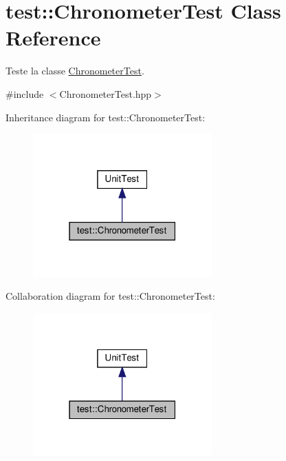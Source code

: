 \hypertarget{classtest_1_1ChronometerTest}{}\section{test\+:\+:Chronometer\+Test Class Reference}
\label{classtest_1_1ChronometerTest}


Teste la classe \hyperlink{classtest_1_1ChronometerTest}{Chronometer\+Test}.  




{\ttfamily \#include $<$Chronometer\+Test.\+hpp$>$}



Inheritance diagram for test\+:\+:Chronometer\+Test\+:
\nopagebreak
\begin{figure}[H]
\begin{center}
\leavevmode
\includegraphics[width=195pt]{classtest_1_1ChronometerTest__inherit__graph}
\end{center}
\end{figure}


Collaboration diagram for test\+:\+:Chronometer\+Test\+:
\nopagebreak
\begin{figure}[H]
\begin{center}
\leavevmode
\includegraphics[width=195pt]{classtest_1_1ChronometerTest__coll__graph}
\end{center}
\end{figure}
